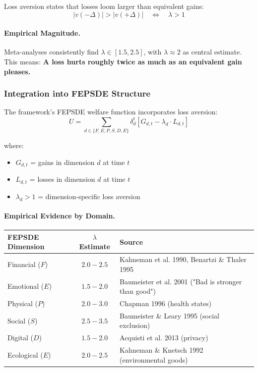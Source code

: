 Loss aversion states that losses loom larger than equivalent gains:
\begin{equation}
\boxed{
|v(-\Delta)| > |v(+\Delta)| \quad \Leftrightarrow \quad \lambda > 1
}
\label{eq:kt-loss-aversion}
\end{equation}

\paragraph{Empirical Magnitude.}
Meta-analyses consistently find $\lambda \in [1.5, 2.5]$, with $\lambda \approx 2$ 
as central estimate. This means: \textbf{A loss hurts roughly twice as much as 
an equivalent gain pleases.}

\subsubsection{Integration into FEPSDE Structure}

The framework's FEPSDE welfare function incorporates loss aversion:
\begin{equation}
U = \sum_{d \in \{F,E,P,S,D,E\}} \delta_d^t \left[ G_{d,t} - \lambda_d \cdot L_{d,t} \right]
\label{eq:fepsde-loss}
\end{equation}

where:
\begin{itemize}
    \item $G_{d,t}$ = gains in dimension $d$ at time $t$
    \item $L_{d,t}$ = losses in dimension $d$ at time $t$
    \item $\lambda_d > 1$ = dimension-specific loss aversion
\end{itemize}

\paragraph{Empirical Evidence by Domain.}

\begin{center}
\renewcommand{\arraystretch}{1.3}
\begin{tabular}{|l|c|l|}
\hline
\textbf{FEPSDE Dimension} & \textbf{$\lambda$ Estimate} & \textbf{Source} \\
\hline
Financial ($F$) & $2.0 - 2.5$ & Kahneman et al. 1990, Benartzi \& Thaler 1995 \\
Emotional ($E$) & $1.5 - 2.0$ & Baumeister et al. 2001 ("Bad is stronger than good") \\
Physical ($P$) & $2.0 - 3.0$ & Chapman 1996 (health states) \\
Social ($S$) & $2.5 - 3.5$ & Baumeister \& Leary 1995 (social exclusion) \\
Digital ($D$) & $1.5 - 2.0$ & Acquisti et al. 2013 (privacy) \\
Ecological ($E$) & $2.0 - 2.5$ & Kahneman \& Knetsch 1992 (environmental goods) \\
\hline
\end{tabular}
\end{center}

